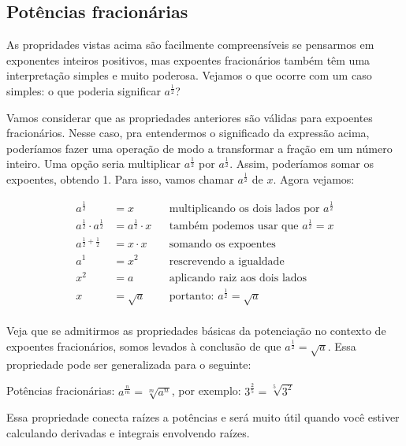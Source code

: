 \documentclass[main.tex]{subfiles}
\begin{document}
\subsection*{Potências fracionárias}

As propridades vistas acima são facilmente compreensíveis se pensarmos em exponentes inteiros positivos, mas expoentes fracionários também têm uma interpretação simples e muito poderosa. Vejamos o que ocorre com um caso simples: o que poderia significar $a^\frac{1}{2}$? 

Vamos considerar que as propriedades anteriores são válidas para expoentes fracionários. Nesse caso, pra entendermos o significado da expressão acima, poderíamos fazer uma operação de modo a transformar a fração em um número inteiro. Uma opção seria multiplicar $a^\frac{1}{2}$ por $a^\frac{1}{2}$. Assim, poderíamos somar os expoentes, obtendo 1. Para isso, vamos chamar $a^\frac{1}{2}$ de $x$. Agora vejamos:

\begin{align*}
a^\frac{1}{2} &= x && \text{multiplicando os dois lados por } a^\frac{1}{2} \\
a^\frac{1}{2} \cdot a^\frac{1}{2} &= a^\frac{1}{2} \cdot x && \text{também podemos usar que } a^\frac{1}{2} = x \\
a^{\frac{1}{2}+\frac{1}{2}} &= x \cdot x && \text{somando os expoentes}\\
a^1 &= x^2 && \text{rescrevendo a igualdade}\\
x^2 &= a && \text{aplicando raiz aos dois lados}\\
x &= \sqrt{a} && \text{portanto: } a^\frac{1}{2} = \sqrt{a} \\
\end{align*}

Veja que se admitirmos as propriedades básicas da potenciação no contexto de expoentes fracionários, somos levados à conclusão de que $a^\frac{1}{2} = \sqrt{a}$. Essa propriedade pode ser generalizada para o seguinte:

\begin{caixaExemplo}
 Potências fracionárias: $a^\frac{n}{m}  = \sqrt[m]{a^n}$, por exemplo: $3^{\frac{2}{5}}=\sqrt[5]{3^2}$
\end{caixaExemplo}

Essa propriedade conecta raízes a potências e será muito útil quando você estiver calculando derivadas e integrais envolvendo raízes.
\end{document}
